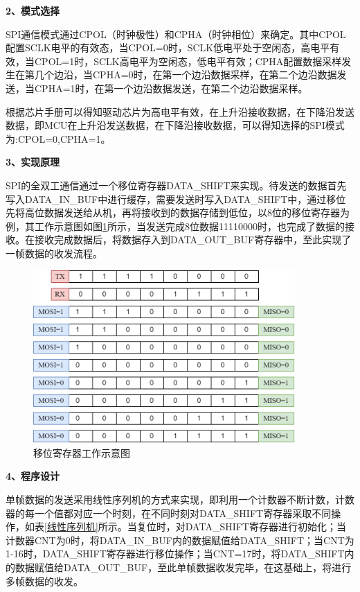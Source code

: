     \noindent
    \textbf{2、模式选择}\par
    SPI通信模式通过CPOL（时钟极性）和CPHA（时钟相位）来确定。其中CPOL配置SCLK电平的有效态，当CPOL=0时，SCLK低电平处于空闲态，高电平有效，当CPOL=1时，SCLK高电平为空闲态，低电平有效；CPHA配置数据采样发生在第几个边沿，当CPHA=0时，在第一个边沿数据采样，在第二个边沿数据发送，当CPHA=1时，在第一个边沿数据发送，在第二个边沿数据采样。\par
    根据芯片手册可以得知驱动芯片为高电平有效，在上升沿接收数据，在下降沿发送数据，即MCU在上升沿发送数据，在下降沿接收数据，可以得知选择的SPI模式为:CPOL=0,CPHA=1。
    
    \noindent
    \textbf{3、实现原理}\par
    SPI的全双工通信通过一个移位寄存器DATA\_SHIFT来实现。待发送的数据首先写入DATA\_IN\_BUF中进行缓存，需要发送时写入DATA\_SHIFT中，通过移位先将高位数据发送给从机，再将接收到的数据存储到低位，以8位的移位寄存器为例，其工作示意图如图\ref{移位寄存器工作示意图}所示，当发送完成8位数据11110000时，也完成了数据的接收。在接收完成数据后，将数据存入到DATA\_OUT\_BUF寄存器中，至此实现了一帧数据的收发流程。
        \begin{figure}[H]
        \centering
        \includegraphics[width=10cm]{figure/DATA_SHIFT.png}
        \songti{}\caption{移位寄存器工作示意图}
        \label{移位寄存器工作示意图}
    \end{figure}
    
    
    \noindent
    \textbf{4、程序设计}\par
    单帧数据的发送采用线性序列机的方式来实现，即利用一个计数器不断计数，计数器的每一个值都对应一个时刻，在不同时刻对DATA\_SHIFT寄存器采取不同操作，如表\ref{线性序列机}所示。当复位时，对DATA\_SHIFT寄存器进行初始化；当计数器CNT为0时，将DATA\_IN\_BUF内的数据赋值给DATA\_SHIFT；当CNT为1-16时，DATA\_SHIFT寄存器进行移位操作；当CNT=17时，将DATA\_SHIFT内的数据赋值给DATA\_OUT\_BUF，至此单帧数据收发完毕，在这基础上，将进行多帧数据的收发。
    
